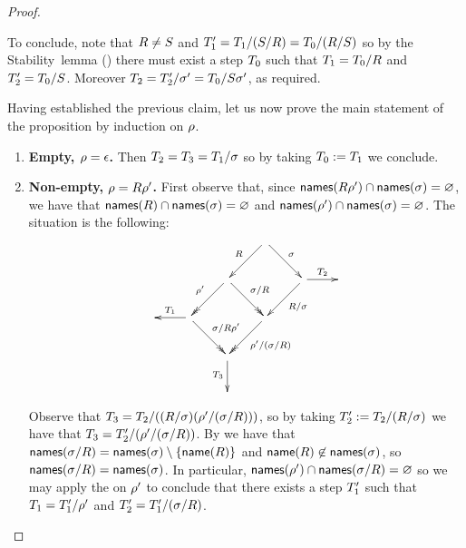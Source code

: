 \begin{proof}
\begin{enumerate}
  To conclude, note that $R \neq S$ and
  $T'_1 = T_1/(S/R) = T_0/(R/S)$
  so by the Stability~lemma ()
  there must exist a step $T_0$ such that
  $T_1 = T_0/R$
  and $T'_2 = T_0/S$.
  Moreover $T_2 = T'_2/\sigma' = T_0/S\sigma'$,
  as required.
\end{enumerate}
Having established the previous claim, let us now prove the main statement of the
proposition by induction on $\rho$.
\begin{enumerate}
\item {\bf Empty, $\rho = \epsilon$.}
  Then $T_2 = T_3 = T_1/\sigma$ so by taking $T_0 := T_1$
  we conclude.
\item {\bf Non-empty, $\rho = R\rho'$.}
  First observe that, since $\mathsf{names}(R\rho') \cap \mathsf{names}(\sigma) = \varnothing$,
  we have that $\mathsf{names}(R) \cap \mathsf{names}(\sigma) = \varnothing$ 
  and $\mathsf{names}(\rho') \cap \mathsf{names}(\sigma) = \varnothing$.
  The situation is the following:
  \[
    \xymatrix{
      &
      &
      &
        \ar[dl]_{\redex}
        \ar[dr]^{\redseqtwo}
      &
    \\
      &
      &
        \ar@{->>}[dl]_{\redseq'}
        \ar@{->>}[dr]^{\redseqtwo/\redex}
      &
      &
        \ar[dl]^{\redex/\redseqtwo}
        \ar[r]^{\redexthree_2}
      &
    \\
      &
        \ar[l]_{\redexthree_1}
        \ar@{->>}[dr]^{\redseqtwo/\redex\redseq'}
      &
      &
        \ar@{->>}[dl]^{\redseq'/(\redseqtwo/\redex)}
      &
    \\
      &
      &
        \ar[d]_{\redexthree_3}
      &
      &
    \\
      &
      &
      &
      &
    \\
    }
  \]
  Observe that $T_3 = T_2/((R/\sigma)(\rho'/(\sigma/R)))$,
  so by taking $T'_2 := T_2/(R/\sigma)$
  we have that $T_3 = T'_2/(\rho'/(\sigma/R))$.
  By 
  we have that $\mathsf{names}(\sigma/R) = \mathsf{names}(\sigma) \setminus \{\mathsf{name}(R)\}$
  and $\mathsf{name}(R) \not\in \mathsf{names}(\sigma)$,
  so $\mathsf{names}(\sigma/R) = \mathsf{names}(\sigma)$.
  In particular, $\mathsf{names}(\rho') \cap \mathsf{names}(\sigma/R) = \varnothing$
  so we may apply the \ih on $\rho'$ to conclude that there exists
  a step $T'_1$ such that
  $T_1 = T'_1/\rho'$
  and
  $T'_2 = T'_1/(\sigma/R)$.


\end{enumerate}
\end{proof}
